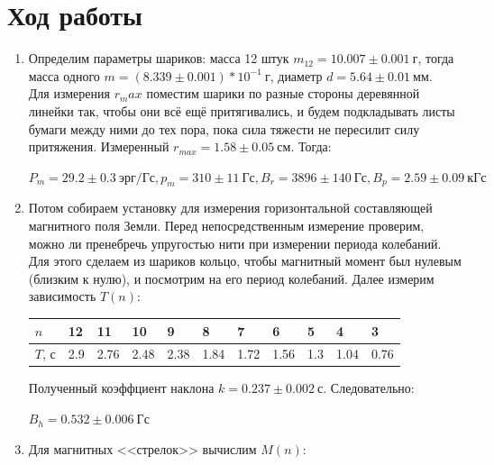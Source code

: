 \documentclass[a4paper,12pt]{article}
\begin{document}
\section*{Ход работы}
\begin{enumerate}
\item Определим параметры шариков: масса 12 штук $m_{12} = 10.007\pm 0.001~\text{г}$, тогда масса одного $m = (8.339 \pm 0.001)*10^{-1}~\text{г}$, диаметр $d = 5.64 \pm 0.01~\text{мм}$.\\
Для измерения $r_max$ поместим шарики по разные стороны деревянной линейки так, чтобы они всё ещё притягивались, и будем подкладывать листы бумаги между ними до тех пора, пока сила тяжести не пересилит силу притяжения. Измеренный $r_{max} = 1.58 \pm 0.05~\text{см}$. Тогда:
\begin{center}
$P_m = 29.2 \pm 0.3~\text{эрг/Гс}, p_m = 310 \pm 11~\text{Гс}, B_r = 3896 \pm 140~\text{Гс},  B_p = 2.59 \pm 0.09~\text{кГс}$
\end{center}
\item Потом собираем установку для измерения горизонтальной составляющей магнитного поля Земли. Перед непосредственным измерение проверим, можно ли пренебречь упругостью нити при измерении периода колебаний. Для этого сделаем из шариков кольцо, чтобы магнитный момент был нулевым (близким к нулю), и посмотрим на его период колебаний. 
Далее измерим зависимость $T(n)$:
\begin{table}[h]
\centering
\begin{tabular}{|l|l|l|l|l|l|l|l|l|l|l|}
\hline
$n$ & 12    & 11    & 10    & 9     & 8     & 7     & 6     & 5     & 4     & 3    \\ \hline
$T$, с & 2.9 & 2.76 & 2.48 & 2.38 & 1.84 & 1.72 & 1.56 & 1.3 & 1.04 & 0.76 \\ \hline
\end{tabular}
\end{table}
\begin{center}
\end{center}
Полученный коэффциент наклона $k= 0.237 \pm 0.002~\text{с}$. Следовательно:
\begin{center}
\textbf{$B_h = 0.532 \pm 0.006~\text{Гс}$}
\end{center}
\item Для магнитных <<стрелок>> вычислим $M(n)$:


\end{enumerate}
\end{document}
